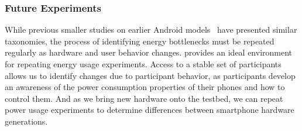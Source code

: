 \subsubsection{Future Experiments}

While previous smaller studies on earlier Android
models~\cite{shye:micro:2009} have presented similar taxonomies, the process
of identifying energy bottlenecks must be repeated regularly as hardware and
user behavior changes. \PhoneLab{} provides an ideal environment for
repeating energy usage experiments. Access to a stable set of participants
allows us to identify changes due to participant behavior, as participants
develop an awareness of the power consumption properties of their phones and
how to control them. And as we bring new hardware onto the testbed, we can
repeat power usage experiments to determine differences between smartphone
hardware generations.

